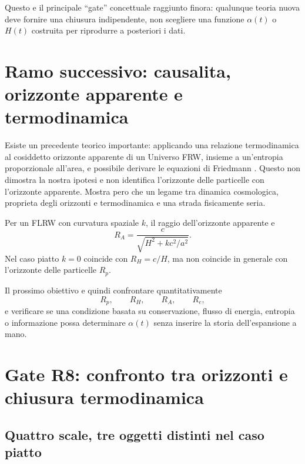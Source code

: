 \documentclass[11pt,a4paper]{article}
\begin{document}
Questo e il principale ``gate'' concettuale raggiunto finora: qualunque teoria nuova deve fornire una chiusura indipendente, non scegliere una funzione $\alpha(t)$ o $H(t)$ costruita per riprodurre a posteriori i dati.

\section{Ramo successivo: causalita, orizzonte apparente e termodinamica}

Esiste un precedente teorico importante: applicando una relazione termodinamica al cosiddetto orizzonte apparente di un Universo FRW, insieme a un'entropia proporzionale all'area, e possibile derivare le equazioni di Friedmann \cite{CaiKim2005}. Questo non dimostra la nostra ipotesi e non identifica l'orizzonte delle particelle con l'orizzonte apparente. Mostra pero che un legame tra dinamica cosmologica, proprieta degli orizzonti e termodinamica e una strada fisicamente seria.

Per un FLRW con curvatura spaziale $k$, il raggio dell'orizzonte apparente e
\begin{equation}
 R_A=\frac{c}{\sqrt{H^2+kc^2/a^2}}.
\end{equation}
Nel caso piatto $k=0$ coincide con $R_H=c/H$, ma non coincide in generale con l'orizzonte delle particelle $R_p$.

Il prossimo obiettivo e quindi confrontare quantitativamente
\begin{equation}
 R_p,\qquad R_H,\qquad R_A,\qquad R_e,
\end{equation}
e verificare se una condizione basata su conservazione, flusso di energia, entropia o informazione possa determinare $\alpha(t)$ senza inserire la storia dell'espansione a mano.


\section{Gate R8: confronto tra orizzonti e chiusura termodinamica}

\subsection{Quattro scale, tre oggetti distinti nel caso piatto}
\end{document}
